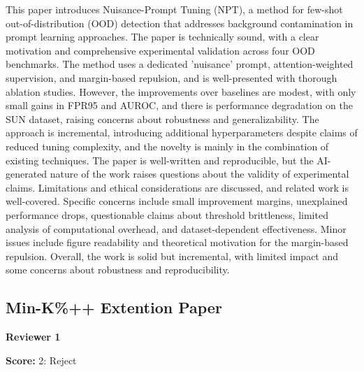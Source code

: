 \begin{tcolorbox}[
    colback=white,
    colframe=black!70,
    title=Reviewer Comments,
    breakable=true,
    fonttitle=\bfseries
]
This paper introduces Nuisance-Prompt Tuning (NPT), a method for few-shot out-of-distribution (OOD) detection that addresses background contamination in prompt learning approaches. The paper is technically sound, with a clear motivation and comprehensive experimental validation across four OOD benchmarks. The method uses a dedicated 'nuisance' prompt, attention-weighted supervision, and margin-based repulsion, and is well-presented with thorough ablation studies. However, the improvements over baselines are modest, with only small gains in FPR95 and AUROC, and there is performance degradation on the SUN dataset, raising concerns about robustness and generalizability. The approach is incremental, introducing additional hyperparameters despite claims of reduced tuning complexity, and the novelty is mainly in the combination of existing techniques. The paper is well-written and reproducible, but the AI-generated nature of the work raises questions about the validity of experimental claims. Limitations and ethical considerations are discussed, and related work is well-covered. Specific concerns include small improvement margins, unexplained performance drops, questionable claims about threshold brittleness, limited analysis of computational overhead, and dataset-dependent effectiveness. Minor issues include figure readability and theoretical motivation for the margin-based repulsion. Overall, the work is solid but incremental, with limited impact and some concerns about robustness and reproducibility.
\end{tcolorbox}


\subsection{Min-K\%++ Extention Paper}
\textbf{Reviewer 1}
\begin{tcolorbox}[
    colback=gray!5,
    colframe=gray!60,
    title=Review Score,
    fonttitle=\bfseries
]
\textbf{Score:} 2: Reject
\end{tcolorbox}


